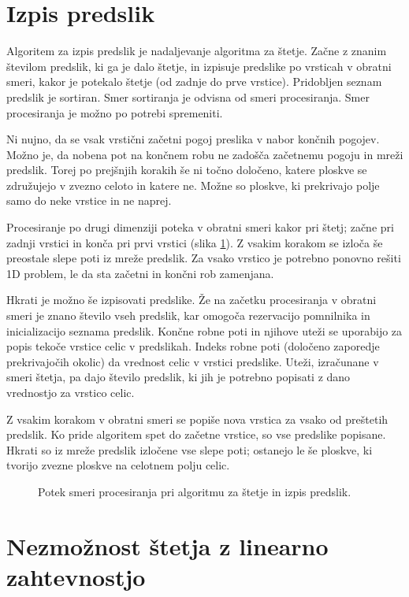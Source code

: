 \documentclass[12pt,a4paper,openany,twoside]{book}
\begin{document}
\section{Izpis predslik}

Algoritem za izpis predslik je nadaljevanje algoritma za štetje.
Začne z znanim številom predslik, ki ga je dalo štetje, in izpisuje predslike
po vrsticah v obratni smeri, kakor je potekalo štetje (od zadnje do prve vrstice).
Pridobljen seznam predslik je sortiran. Smer sortiranja je odvisna od smeri procesiranja.
Smer procesiranja je možno po potrebi spremeniti.

Ni nujno, da se vsak vrstični začetni pogoj preslika v nabor končnih pogojev.
Možno je, da nobena pot na končnem robu ne zadošča začetnemu pogoju in mreži predslik.
Torej po prejšnjih korakih še ni točno določeno, katere ploskve se združujejo v zvezno
celoto in katere ne. Možne so ploskve, ki prekrivajo polje samo do neke vrstice in ne naprej.

Procesiranje po drugi dimenziji poteka v obratni smeri kakor pri štetj;
začne pri zadnji vrstici in konča pri prvi vrstici (slika \ref{algorithm_list}).
Z vsakim korakom se izloča še preostale slepe poti iz mreže predslik.
Za vsako vrstico je potrebno ponovno rešiti 1D problem,
le da sta začetni in končni rob zamenjana.

Hkrati je možno še izpisovati predslike. Že na začetku procesiranja v obratni smeri
je znano število vseh predslik, kar omogoča rezervacijo pomnilnika in inicializacijo seznama predslik.
Končne robne poti in njihove uteži se uporabijo za popis tekoče vrstice celic v predslikah.
Indeks robne poti (določeno zaporedje prekrivajočih okolic) da vrednost celic v vrstici predslike.
Uteži, izračunane v smeri štetja, pa dajo število predslik,
ki jih je potrebno popisati z dano vrednostjo za vrstico celic.

Z vsakim korakom v obratni smeri se popiše nova vrstica za vsako od preštetih predslik.
Ko pride algoritem spet do začetne vrstice, so vse predslike popisane.
Hkrati so iz mreže predslik izločene vse slepe poti; ostanejo le še ploskve,
ki tvorijo zvezne ploskve na celotnem polju celic.

\begin{figure}[htb]
\centerline{}
\caption[Algoritem za izpis predslik.]{Potek smeri procesiranja pri algoritmu za štetje in izpis predslik.}
\label{algorithm_list}
\end{figure}

\section{Nezmožnost štetja z linearno zahtevnostjo}
\end{document}
